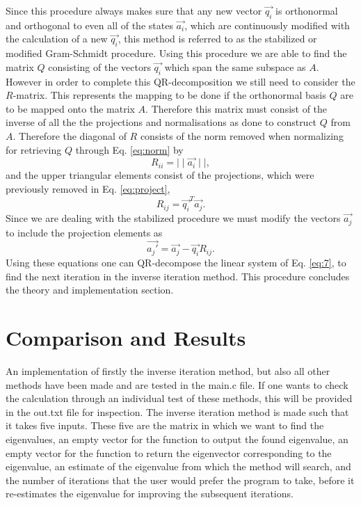 \documentclass[twocolumn]{article}
\begin{document}
Since this procedure always makes sure that any new vector $\vec{q_i}$ is orthonormal and orthogonal to even all of the states $\vec{a_i}$, which are continuously modified with the calculation of a new $\vec{q_i}$, this method is referred to as the stabilized or modified Gram-Schmidt procedure. Using this procedure we are able to find the matrix $Q$ consisting of the vectors $\vec{q_i}$ which span the same subspace as $A$. However in order to complete this QR-decomposition we still need to consider the $R$-matrix. This represents the mapping to be done if the orthonormal basis $Q$ are to be mapped onto the matrix $A$. Therefore this matrix must consist of the inverse of all the the projections and normalisations as done to construct $Q$ from $A$. Therefore the diagonal of $R$ consists of the norm removed when normalizing for retrieving $Q$ through Eq. \eqref{eq:norm} by
\begin{equation}
R_{ii}= \mid \mid \vec{a_i} \mid \mid,
\end{equation}
and the upper triangular elements consist of the projections, which were previously removed in Eq. \eqref{eq:project},
\begin{equation}
R_{ij}= \vec{q_i}^T \vec{a_j}.
\end{equation}
Since we are dealing with the stabilized procedure we must modify the vectors $\vec{a_j}$ to include the projection elements as
\begin{equation}
\vec{a_j'} = \vec{a_j}  - \vec{q_i} R_{ij}.
\end{equation}
Using these equations one can QR-decompose the linear system of Eq. \eqref{eq:7}, to find the next iteration in the inverse iteration method. This procedure concludes the theory and implementation section.

\section{\label{sec:5}Comparison and Results}
An implementation of firstly the inverse iteration method, but also all other methods have been made and are tested in the main.c file. If one wants to check the calculation through an individual test of these methods, this will be provided in the out.txt file for inspection. The inverse iteration method is made such that it takes five inputs. These five are the matrix in which we want to find the eigenvalues, an empty vector for the function to output the found eigenvalue, an empty vector for the function to return the eigenvector corresponding to the eigenvalue, an estimate of the eigenvalue from which the method will search, and the number of iterations that the user would prefer the program to take, before it re-estimates the eigenvalue for improving the subsequent iterations.
\end{document}

